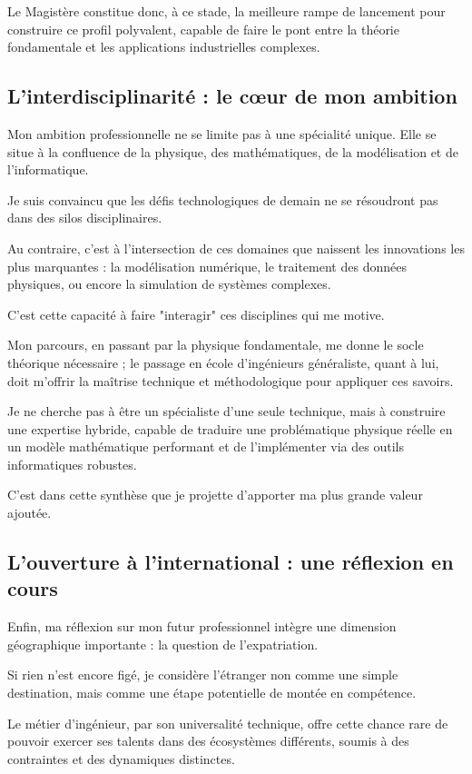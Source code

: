Le Magistère constitue donc, à ce stade, 
la meilleure rampe de lancement pour construire ce profil polyvalent, 
capable de faire le pont entre la théorie fondamentale et les applications industrielles complexes.

\subsection{L'interdisciplinarité : le cœur de mon ambition}

Mon ambition professionnelle ne se limite pas à une spécialité unique. 
Elle se situe à la confluence de la physique, des mathématiques, de la modélisation et de l'informatique. 

Je suis convaincu que les défis technologiques de demain 
ne se résoudront pas dans des silos disciplinaires. 

Au contraire, c'est à l'intersection de ces domaines que naissent les innovations les plus marquantes : 
la modélisation numérique, 
le traitement des données physiques, 
ou encore la simulation de systèmes complexes. 

C'est cette capacité à faire "interagir" ces disciplines qui me motive. 

Mon parcours, en passant par la physique fondamentale, 
me donne le socle théorique nécessaire ; 
le passage en école d'ingénieurs généraliste, quant à lui, 
doit m'offrir la maîtrise technique et méthodologique pour appliquer ces savoirs. 

Je ne cherche pas à être un spécialiste d'une seule technique, 
mais à construire une expertise hybride, 
capable de traduire une problématique physique réelle en un modèle mathématique performant 
et de l'implémenter via des outils informatiques robustes. 

C'est dans cette synthèse que je projette d'apporter ma plus grande valeur ajoutée.

\subsection{L'ouverture à l'international : une réflexion en cours}

Enfin, ma réflexion sur mon futur professionnel intègre une dimension géographique importante : 
la question de l'expatriation. 

Si rien n'est encore figé, 
je considère l'étranger non comme une simple destination, 
mais comme une étape potentielle de montée en compétence. 

Le métier d'ingénieur, par son universalité technique, 
offre cette chance rare de pouvoir exercer ses talents dans des écosystèmes différents, 
soumis à des contraintes et des dynamiques distinctes. 

